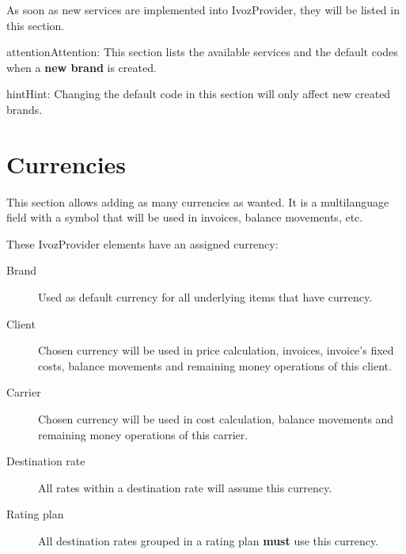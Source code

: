 \documentclass[letterpaper,10pt,english]{sphinxmanual}
\begin{document}
As soon as new services are implemented into IvozProvider, they will be listed
in this section.

\begin{notice}{attention}{Attention:}
This section lists the available services and the default codes
when a \textbf{new brand} is created.
\end{notice}

\begin{notice}{hint}{Hint:}
Changing the default code in this section will only affect new
created brands.
\end{notice}


\section{Currencies}
\label{administration_portal/platform/currencies:currencies}\label{administration_portal/platform/currencies::doc}
This section allows adding as many currencies as wanted. It is a multilanguage field with a symbol that will be used
in invoices, balance movements, etc.

These IvozProvider elements have an assigned currency:
\begin{description}
\item[{Brand}] \leavevmode{}\label{administration_portal/platform/currencies:term-brand}
Used as default currency for all underlying items that have currency.

\item[{Client}] \leavevmode{}\label{administration_portal/platform/currencies:term-client}
Chosen currency will be used in price calculation, invoices, invoice's fixed costs, balance movements and
remaining money operations of this client.

\item[{Carrier}] \leavevmode{}\label{administration_portal/platform/currencies:term-carrier}
Chosen currency will be used in cost calculation, balance movements and
remaining money operations of this carrier.

\item[{Destination rate}] \leavevmode{}\label{administration_portal/platform/currencies:term-destination-rate}
All rates within a destination rate will assume this currency.

\item[{Rating plan}] \leavevmode{}\label{administration_portal/platform/currencies:term-rating-plan}
All destination rates grouped in a rating plan \textbf{must} use this currency.

\end{description}
\end{document}
